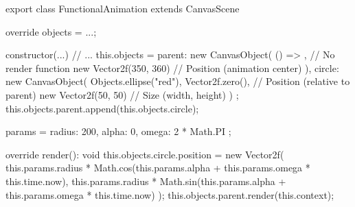 export class FunctionalAnimation extends CanvasScene { 
    override objects = {...};
    
    constructor(...) {
        // ...
        this.objects = {
            parent: new CanvasObject(
                () => {},              // No render function
                new Vector2f(350, 360) // Position (animation center)
            ),
            circle: new CanvasObject(
                Objects.ellipse("red"),
                Vector2f.zero(),       // Position (relative to parent)
                new Vector2f(50, 50)   // Size (width, height)
            )
        };
        this.objects.parent.append(this.objects.circle);
    }

    params = { radius: 200, alpha: 0, omega: 2 * Math.PI };

    override render(): void {
        this.objects.circle.position = new Vector2f(
            this.params.radius * Math.cos(this.params.alpha + this.params.omega * this.time.now),
            this.params.radius * Math.sin(this.params.alpha + this.params.omega * this.time.now)
        );
        this.objects.parent.render(this.context);
    }
}
